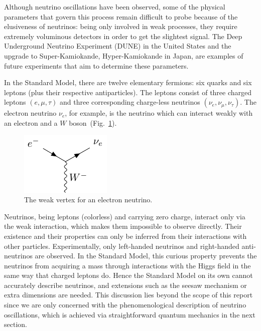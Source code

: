 Although neutrino oscillations have been observed, some of the physical parameters that
govern this process remain difficult to probe because of the elusiveness of
neutrinos: being only involved in weak processes, they require extremely
voluminous detectors in order to get the slightest signal.
The Deep Underground Neutrino Experiment (DUNE) in the United States and the
upgrade to Super-Kamiokande, Hyper-Kamiokande in Japan, are examples of
future experiments that aim to determine these parameters.

In the Standard Model, there are twelve elementary fermions: six quarks and six
leptons (plus their respective antiparticles). The leptons consist of three
charged leptons $(e, \mu, \tau)$ and three corresponding charge-less neutrinos
$(\nu_e, \nu_\mu, \nu_\tau)$. The electron neutrino $\nu_e$, for example, is
the neutrino which can interact weakly with an electron and a
$W$ boson~(Fig.~\ref{fig:weak_vertex}). 

\begin{figure}
	\includegraphics{images/weak_vertex.pdf}
	\captionsetup{justification=centering}
	\caption{The weak vertex for an electron neutrino.}
	\label{fig:weak_vertex}
\end{figure}

Neutrinos, being leptons (colorless) and carrying zero charge, interact only via the weak
interaction, which makes them impossible to observe directly. Their existence
and their properties can only be inferred from their interactions with other
particles.
Experimentally, only left-handed neutrinos and right-handed
anti-neutrinos are observed. In the Standard Model, this curious property
prevents the neutrinos from acquiring a mass through interactions with the
Higgs field in the same way that charged leptons do\cite{schwichtenberg}. Hence
the Standard Model on its own cannot accurately describe neutrinos, and
extensions such as the seesaw mechanism or extra dimensions are needed. This
discussion lies beyond the scope of this report since we are only concerned
with the phenomenological description of neutrino oscillations, which is
achieved via straightforward quantum mechanics in the next section.

